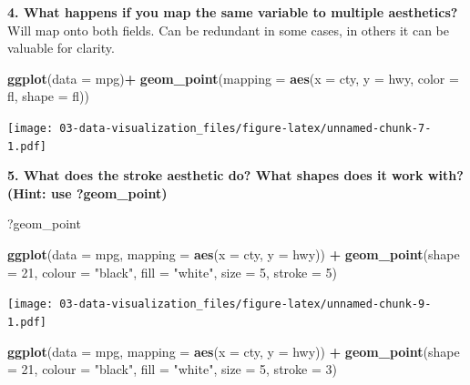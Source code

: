 \documentclass[]{book}
\newenvironment{Shaded}{\begin{snugshade}}{\end{snugshade}}
\newcommand{\DataTypeTok}[1]{\textcolor[rgb]{0.13,0.29,0.53}{#1}}
\newcommand{\DecValTok}[1]{\textcolor[rgb]{0.00,0.00,0.81}{#1}}
\newcommand{\KeywordTok}[1]{\textcolor[rgb]{0.13,0.29,0.53}{\textbf{#1}}}
\newcommand{\NormalTok}[1]{#1}
\newcommand{\OperatorTok}[1]{\textcolor[rgb]{0.81,0.36,0.00}{\textbf{#1}}}
\newcommand{\StringTok}[1]{\textcolor[rgb]{0.31,0.60,0.02}{#1}}
\theoremstyle{definition}
\theoremstyle{definition}
\theoremstyle{definition}
\theoremstyle{remark}
\begin{document}
\textbf{4. What happens if you map the same variable to multiple
aesthetics?}\\
Will map onto both fields. Can be redundant in some cases, in others it
can be valuable for clarity.

\begin{Shaded}
\begin{Highlighting}[]
\KeywordTok{ggplot}\NormalTok{(}\DataTypeTok{data =}\NormalTok{ mpg)}\OperatorTok{+}
\StringTok{  }\KeywordTok{geom_point}\NormalTok{(}\DataTypeTok{mapping =} \KeywordTok{aes}\NormalTok{(}\DataTypeTok{x =}\NormalTok{ cty, }\DataTypeTok{y =}\NormalTok{ hwy, }\DataTypeTok{color =}\NormalTok{ fl, }\DataTypeTok{shape =}\NormalTok{ fl))}
\end{Highlighting}
\end{Shaded}

\texttt{[image: 03-data-visualization\_files/figure-latex/unnamed-chunk-7-1.pdf]}

\textbf{5. What does the stroke aesthetic do? What shapes does it work
with? (Hint: use ?geom\_point)}

\begin{Shaded}
\begin{Highlighting}[]
\NormalTok{?geom_point}
\end{Highlighting}
\end{Shaded}

\begin{Shaded}
\begin{Highlighting}[]
\KeywordTok{ggplot}\NormalTok{(}\DataTypeTok{data =}\NormalTok{ mpg, }\DataTypeTok{mapping =} \KeywordTok{aes}\NormalTok{(}\DataTypeTok{x =}\NormalTok{ cty, }\DataTypeTok{y =}\NormalTok{ hwy)) }\OperatorTok{+}
\StringTok{  }\KeywordTok{geom_point}\NormalTok{(}\DataTypeTok{shape =} \DecValTok{21}\NormalTok{, }\DataTypeTok{colour =} \StringTok{"black"}\NormalTok{, }\DataTypeTok{fill =} \StringTok{"white"}\NormalTok{, }\DataTypeTok{size =} \DecValTok{5}\NormalTok{, }\DataTypeTok{stroke =} \DecValTok{5}\NormalTok{)}
\end{Highlighting}
\end{Shaded}

\texttt{[image: 03-data-visualization\_files/figure-latex/unnamed-chunk-9-1.pdf]}

\begin{Shaded}
\begin{Highlighting}[]
\KeywordTok{ggplot}\NormalTok{(}\DataTypeTok{data =}\NormalTok{ mpg, }\DataTypeTok{mapping =} \KeywordTok{aes}\NormalTok{(}\DataTypeTok{x =}\NormalTok{ cty, }\DataTypeTok{y =}\NormalTok{ hwy)) }\OperatorTok{+}
\StringTok{  }\KeywordTok{geom_point}\NormalTok{(}\DataTypeTok{shape =} \DecValTok{21}\NormalTok{, }\DataTypeTok{colour =} \StringTok{"black"}\NormalTok{, }\DataTypeTok{fill =} \StringTok{"white"}\NormalTok{, }\DataTypeTok{size =} \DecValTok{5}\NormalTok{, }\DataTypeTok{stroke =} \DecValTok{3}\NormalTok{)}
\end{Highlighting}
\end{Shaded}
\end{document}
